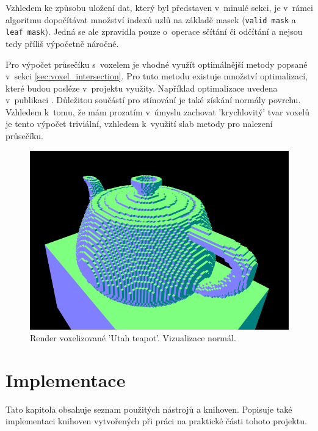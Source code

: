 Vzhledem ke způsobu uložení dat, který byl představen v~minulé sekci, je v~rámci algoritmu dopočítávat množství indexů uzlů na základě masek (\texttt{valid mask} a \texttt{leaf mask}). Jedná se ale zpravidla pouze o~operace sčítání či odčítání a nejsou tedy příliš výpočetně náročné.

Pro výpočet průsečíku s~voxelem je vhodné využít optimálnější metody popsané v~sekci \ref{sec:voxel_intersection}. Pro tuto metodu existuje množství optimalizací, které budou posléze v~projektu využity. Například optimalizace uvedena v~publikaci \cite{Majercik2018Voxel}. Důležitou součástí pro stínování je také získání normály povrchu. Vzhledem k~tomu, že mám prozatím v~úmyslu zachovat 'krychlovitý' tvar voxelů je tento výpočet triviální, vzhledem k~využití slab metody pro nalezení průsečíku.

\begin{figure}[H]
	\centering
	\includegraphics[scale=1]{obrazky-figures/normals_teapot.png}
	\caption{Render voxelizované 'Utah teapot'. Vizualizace normál. }
	\label{fig:octree_child}
\end{figure}




\chapter{Implementace}
\label{implementace}

Tato kapitola obsahuje seznam použitých nástrojů a knihoven. Popisuje také implementaci knihoven vytvořených při práci na praktické části tohoto projektu.

